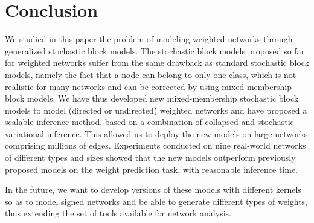 \section{Conclusion}
\label{sec:concl}

We studied in this paper the problem of modeling weighted networks through generalized stochastic block models. The stochastic block models proposed so far for weighted networks suffer from the same drawback as standard stochastic block models, namely the fact that a node can belong to only one class, which is not realistic for many networks and can be corrected by using mixed-membership block models. We have thus developed new mixed-membership stochastic block models to model (directed or undirected) weighted networks and have proposed a scalable inference method, based on a combination of collapsed and stochastic variational inference. This allowed us to deploy the new models on large networks comprising millions of edges. Experiments conducted on nine real-world networks of different types and sizes showed that the new models outperform previously proposed models on the weight prediction task, with reasonable inference time.

In the future, we want to develop versions of these models with different kernels so as to model signed networks and be able to generate different types of weights, thus extending the set of tools available for network analysis.
